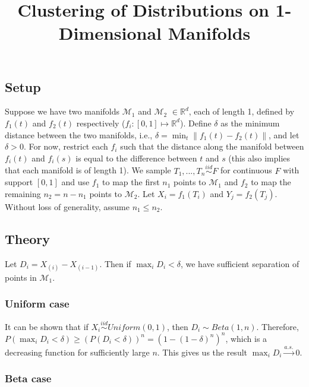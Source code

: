 \documentclass[
  11pt,
]{article}
\title{Clustering of Distributions on 1-Dimensional Manifolds}
\author{}
\date{\vspace{-2.5em}}
\begin{document}
\maketitle

\hypertarget{setup}{%
\subsection{Setup}\label{setup}}

Suppose we have two manifolds \(\mathcal{M}_1\) and \(\mathcal{M}_2\)
\(\in \mathbb{R}^d\), each of length 1, defined by \(f_1(t)\) and
\(f_2(t)\) respectively (\(f_i : [0, 1] \mapsto \mathbb{R}^d\)). Define
\(\delta\) as the minimum distance between the two manifolds, i.e.,
\(\delta = \min_t \|f_1(t) - f_2(t)\|\), and let \(\delta > 0\). For
now, restrict each \(f_i\) such that the distance along the manifold
between \(f_i(t)\) and \(f_i(s)\) is equal to the difference between
\(t\) and \(s\) (this also implies that each manifold is of length 1).
We sample \(T_1, ..., T_n \stackrel{iid}{\sim} F\) for continuous \(F\)
with support \([0, 1]\) and use \(f_1\) to map the first \(n_1\) points
to \(\mathcal{M}_1\) and \(f_2\) to map the remaining \(n_2 = n - n_1\)
points to \(\mathcal{M}_2\). Let \(X_i = f_1(T_i)\) and
\(Y_j = f_2(T_j)\). Without loss of generality, assume \(n_1 \leq n_2\).

\hypertarget{theory}{%
\subsection{Theory}\label{theory}}

Let \(D_i = X_{(i)} - X_{(i-1)}\). Then if \(\max_i D_i < \delta\), we
have sufficient separation of points in \(\mathcal{M}_1\).

\hypertarget{uniform-case}{%
\subsubsection{Uniform case}\label{uniform-case}}

It can be shown that if \(X_i \stackrel{iid}{\sim} Uniform(0, 1)\), then
\(D_i \sim Beta(1, n)\). Therefore,
\(P(\max_i D_i < \delta) \geq (P(D_i < \delta))^n = (1 - (1 - \delta)^n)^n\),
which is a decreasing function for sufficiently large \(n\). This gives
us the result \(\max_i D_i \stackrel{a.s.}{\to} 0\).

\hypertarget{beta-case}{%
\subsubsection{Beta case}\label{beta-case}}
\end{document}
